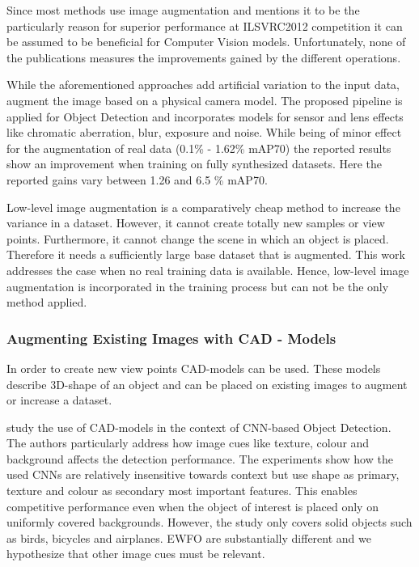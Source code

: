 Since most methods use image augmentation and \citeauthor{Krizhevsky2012a} \cite{Krizhevsky2012a} mentions it to be the particularly reason for superior performance at ILSVRC2012 competition it can be assumed to be beneficial for Computer Vision models. Unfortunately, none of the publications measures the improvements gained by the different operations. 

While the aforementioned approaches add artificial variation to the input data, \citeauthor{Carlson2018}\cite{Carlson2018} augment the image based on a physical camera model. The proposed pipeline is applied for Object Detection and incorporates models for sensor and lens effects like chromatic aberration, blur, exposure and noise. While being of minor effect for the augmentation of real data (0.1\% - 1.62\% \ac{mAP}70) the reported results show an improvement when training on fully synthesized datasets. Here the reported gains vary between 1.26 and 6.5 \% \ac{mAP}70.

Low-level image augmentation is a comparatively cheap method to increase the variance in a dataset. However, it cannot create totally new samples or view points. Furthermore, it cannot change the scene in which an object is placed. Therefore it needs a sufficiently large base dataset that is augmented. This work addresses the case when no real training data is available. Hence, low-level image augmentation is incorporated in the training process but can not be the only method applied.

\subsubsection{Augmenting Existing Images with CAD - Models}

In order to create new view points \ac{CAD}-models can be used. These models describe 3D-shape of an object and can be placed on existing images to augment or increase a dataset.

\citeauthor{Peng}\cite{Peng} study the use of \ac{CAD}-models in the context of \ac{CNN}-based Object Detection. The authors particularly address how image cues like texture, colour and background affects the detection performance. The experiments show how the used \acp{CNN} are relatively insensitive towards context but use shape as primary, texture and colour as secondary most important features. This enables competitive performance even when the object of interest is placed only on uniformly covered backgrounds. However, the study only covers solid objects such as birds, bicycles and airplanes. \ac{EWFO} are substantially different and we hypothesize that other image cues must be relevant.

